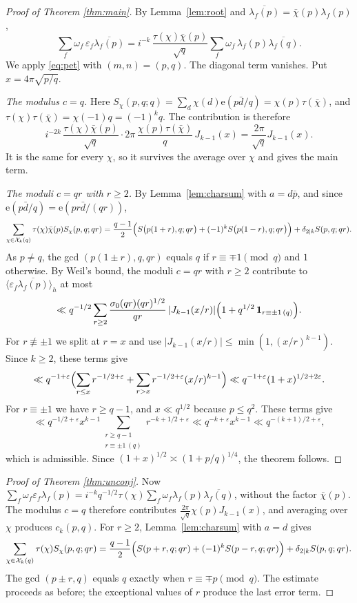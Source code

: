 \documentclass[11pt]{amsart}
\theoremstyle{remark}
\newcommand{\eps}{\varepsilon}
\newcommand{\e}{\mathrm{e}}
\newcommand{\cX}{\mathcal{X}}
\newcommand{\ov}{\overline}
\begin{document}
\begin{proof}[Proof of Theorem \ref{thm:main}]
By Lemma~\ref{lem:root} and $\ov{\lambda_f(p)}=\bar\chi(p)\lambda_f(p)$,
\[
\sum_{f}\omega_f\,\eps_f\ov{\lambda_f(p)}=i^{-k}\,\frac{\tau(\chi)\bar\chi(p)}{\sqrt q}\sum_f\omega_f\,\lambda_f(p)\ov{\lambda_f(q)}.
\]
We apply \eqref{eq:pet} with $(m,n)=(p,q)$. The diagonal term vanishes. Put $x=4\pi\sqrt{p/q}$.

\emph{The modulus $c=q$.} Here $S_\chi(p,q;q)=\sum_d\chi(d)\e(p\bar d/q)=\chi(p)\tau(\bar\chi)$, and $\tau(\chi)\tau(\bar\chi)=\chi(-1)q=(-1)^kq$. The contribution is therefore
\[
i^{-2k}\,\frac{\tau(\chi)\bar\chi(p)}{\sqrt q}\cdot 2\pi\,\frac{\chi(p)\tau(\bar\chi)}{q}\,J_{k-1}(x)=\frac{2\pi}{\sqrt q}J_{k-1}(x).
\]
It is the same for every $\chi$, so it survives the average over $\chi$ and gives the main term.

\emph{The moduli $c=qr$ with $r\ge2$.} By Lemma~\ref{lem:charsum} with $a=d\bar p$, and since $\e(p\bar d/q)=\e(pr\bar d/(qr))$,
\[
\sum_{\chi\in\cX_k(q)}\tau(\chi)\bar\chi(p)S_\chi(p,q;qr)=\frac{q-1}{2}\Bigl(S\bigl(p(1+r),q;qr\bigr)+(-1)^kS\bigl(p(1-r),q;qr\bigr)\Bigr)+\delta_{2\mid k}S(p,q;qr).
\]
As $p\ne q$, the gcd $(p(1\pm r),q,qr)$ equals $q$ if $r\equiv\mp1\pmod q$ and $1$ otherwise. By Weil's bound, the moduli $c=qr$ with $r\ge2$ contribute to $\langle\eps_f\ov{\lambda_f(p)}\rangle_h$ at most
\[
\ll q^{-1/2}\sum_{r\ge2}\frac{\sigma_0(qr)(qr)^{1/2}}{qr}\,|J_{k-1}(x/r)|\Bigl(1+q^{1/2}\,\mathbf 1_{r\equiv\pm1\,(q)}\Bigr).
\]
For $r\not\equiv\pm1$ we split at $r=x$ and use $|J_{k-1}(x/r)|\le\min(1,(x/r)^{k-1})$. Since $k\ge2$, these terms give
\[
\ll q^{-1+\varepsilon}\Bigl(\sum_{r\le x}r^{-1/2+\varepsilon}+\sum_{r>x}r^{-1/2+\varepsilon}(x/r)^{k-1}\Bigr)\ll q^{-1+\varepsilon}(1+x)^{1/2+2\varepsilon}.
\]
For $r\equiv\pm1$ we have $r\ge q-1$, and $x\ll q^{1/2}$ because $p\le q^2$. These terms give
\[
\ll q^{-1/2+\varepsilon}x^{k-1}\sum_{\substack{r\ge q-1\\ r\equiv\pm1\,(q)}}r^{-k+1/2+\varepsilon}\ll q^{-k+\varepsilon}x^{k-1}\ll q^{-(k+1)/2+\varepsilon},
\]
which is admissible. Since $(1+x)^{1/2}\asymp(1+p/q)^{1/4}$, the theorem follows.
\end{proof}

\begin{proof}[Proof of Theorem \ref{thm:unconj}]
Now $\sum_f\omega_f\eps_f\lambda_f(p)=i^{-k}q^{-1/2}\tau(\chi)\sum_f\omega_f\lambda_f(p)\ov{\lambda_f(q)}$, without the factor $\bar\chi(p)$. The modulus $c=q$ therefore contributes $\frac{2\pi}{\sqrt q}\chi(p)J_{k-1}(x)$, and averaging over $\chi$ produces $c_k(p,q)$. For $r\ge2$, Lemma~\ref{lem:charsum} with $a=d$ gives
\[
\sum_{\chi\in\cX_k(q)}\tau(\chi)S_\chi(p,q;qr)=\frac{q-1}{2}\Bigl(S(p+r,q;qr)+(-1)^kS(p-r,q;qr)\Bigr)+\delta_{2\mid k}S(p,q;qr).
\]
The gcd $(p\pm r,q)$ equals $q$ exactly when $r\equiv\mp p\pmod q$. The estimate proceeds as before; the exceptional values of $r$ produce the last error term.
\end{proof}
\end{document}
